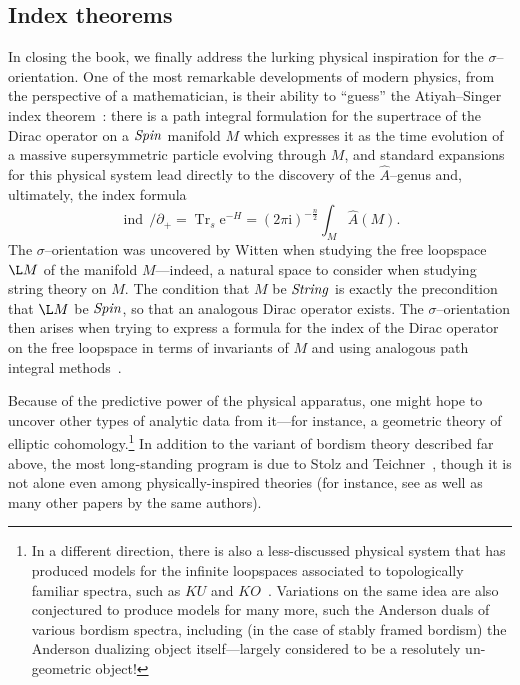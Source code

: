 \subsection*{Index theorems}

In closing the book, we finally address the lurking physical inspiration for the \(\sigma\)--orientation.  One of the most remarkable developments of modern physics, from the perspective of a mathematician, is their ability to ``guess'' the Atiyah--Singer index theorem~\cite[Section 8.6]{Takhtajan}: there is a path integral formulation for the supertrace of the Dirac operator on a \(\mathit{Spin}\) manifold \(M\) which expresses it as the time evolution of a massive supersymmetric particle evolving through \(M\), and standard expansions for this physical system lead directly to the discovery of the \(\widehat A\)--genus and, ultimately, the index formula \[\operatorname{ind}\, /\!\!\!\partial_+ = \operatorname{Tr}_s \mathrm e^{-H} = (2 \pi \mathrm i)^{-\frac{n}{2}} \int_M \widehat A(M).\]  The \(\sigma\)--orientation was uncovered by Witten when studying the free loopspace \(\L M\) of the manifold \(M\)---indeed, a natural space to consider when studying string theory on \(M\).  The condition that \(M\) be \(\mathit{String}\) is exactly the precondition that \(\L M\) be \(\mathit{Spin}\), so that an analogous Dirac operator exists.  The \(\sigma\)--orientation then arises when trying to express a formula for the index of the Dirac operator on the free loopspace in terms of invariants of \(M\) and using analogous path integral methods~\cite{SegalEll}.

Because of the predictive power of the physical apparatus, one might hope to uncover other types of analytic data from it---for instance, a geometric theory of elliptic cohomology.\footnote{In a different direction, there is also a less-discussed physical system that has produced models for the infinite loopspaces associated to topologically familiar spectra, such as \(KU\) and \(KO\)~\cite{Kitaev}.  Variations on the same idea are also conjectured to produce models for many more, such the Anderson duals of various bordism spectra, including (in the case of stably framed bordism) the Anderson dualizing object itself---largely considered to be a resolutely un-geometric object!}  In addition to the variant of bordism theory described far above, the most long-standing program is due to Stolz and Teichner~\cite{StolzTeichnerWhatIs,StolzTeichnerSusy}, though it is not alone even among physically-inspired theories (for instance, see \cite{DouglasHenriques} as well as many other papers by the same authors).

